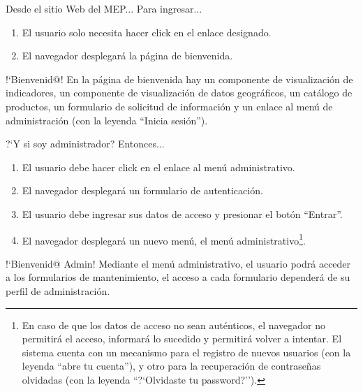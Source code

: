 \documentclass[xcolor=table, aspectratio=169]{beamer}
\begin{document}
\begin{frame}[t]{Desde el sitio Web del MEP...}
    Para ingresar...
    
	\begin{enumerate}
		\item El usuario solo necesita hacer click en el enlace designado.
		\item El navegador desplegar\'a la p\'agina de bienvenida.
	\end{enumerate}
		
	\begin{block}{!`Bienvenid@!}
		En la p\'agina de bienvenida hay un componente de visualizaci\'on de indicadores, un componente de visualizaci\'on de datos geogr\'aficos, un cat\'alogo de productos, un formulario de solicitud de informaci\'on y un enlace al men\'u de administraci\'on (con la leyenda ``Inicia sesi\'on'').
	\end{block}
\end{frame}

\begin{frame}[t]{?`Y si soy administrador?}
    Entonces...
    
	\begin{enumerate}
		\item El usuario debe hacer click en el enlace al men\'u administrativo.
		\item El navegador desplegar\'a un formulario de autenticaci\'on.
		\item El usuario debe ingresar sus datos de acceso y presionar el bot\'on ``Entrar''.
		\item El navegador desplegar\'a un nuevo men\'u, el men\'u administrativo\footnote{En caso de que los datos de acceso no sean aut\'enticos, el navegador no permitir\'a el acceso, informar\'a lo sucedido y permitir\'a volver a intentar. El sistema cuenta con un mecanismo para el registro de nuevos usuarios (con la leyenda ``abre tu cuenta''), y otro para la recuperaci\'on de contrase\~nas olvidadas (con la leyenda ``?`Olvidaste tu password?'').}.
	\end{enumerate}
		
	\begin{block}{!`Bienvenid@ Admin!}
		Mediante el men\'u administrativo, el usuario podr\'a acceder a los formularios de mantenimiento, el acceso a cada formulario depender\'a de su perfil de administraci\'on.
	\end{block}
\end{frame}
\end{document}
